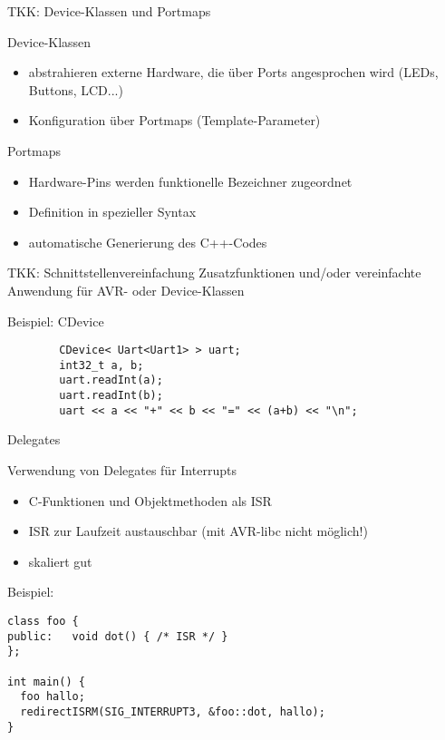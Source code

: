 \documentclass[11pt]{beamer}
\begin{document}
\begin{frame}[fragile]{TKK: Device-Klassen und Portmaps}

	\begin{block}{Device-Klassen}
		\begin{itemize}
			\item abstrahieren externe Hardware, die über Ports angesprochen wird (LEDs, Buttons, LCD...)
			\item Konfiguration über Portmaps (Template-Parameter)
		\end{itemize}
	\end{block}
 
	\begin{block}{Portmaps}
		\begin{itemize}
			\item Hardware-Pins werden funktionelle Bezeichner zugeordnet
			\item Definition in spezieller Syntax
			\item automatische Generierung des C++-Codes
		\end{itemize}
	\end{block}

\end{frame}


\begin{frame}[fragile]{TKK: Schnittstellenvereinfachung}
	Zusatzfunktionen und/oder vereinfachte Anwendung für AVR- oder Device-Klassen

\begin{block}{Beispiel: CDevice}
	\begin{lstlisting}
		CDevice< Uart<Uart1> > uart;
		int32_t a, b;
		uart.readInt(a);
		uart.readInt(b);
		uart << a << "+" << b << "=" << (a+b) << "\n";
	\end{lstlisting}
\end{block}

\end{frame}



\begin{frame}[fragile]{Delegates}

	Verwendung von Delegates für Interrupts

	\begin{itemize}
		\item C-Funktionen und Objektmethoden als ISR
		\item ISR zur Laufzeit austauschbar (mit AVR-libc nicht möglich!)
		\item skaliert gut
	\end{itemize}

\begin{block}{Beispiel:}
	\begin{lstlisting}
class foo {
public:   void dot() { /* ISR */ }
};

int main() {
  foo hallo;
  redirectISRM(SIG_INTERRUPT3, &foo::dot, hallo);
}
	\end{lstlisting}
\end{block}

\end{frame}
\end{document}
